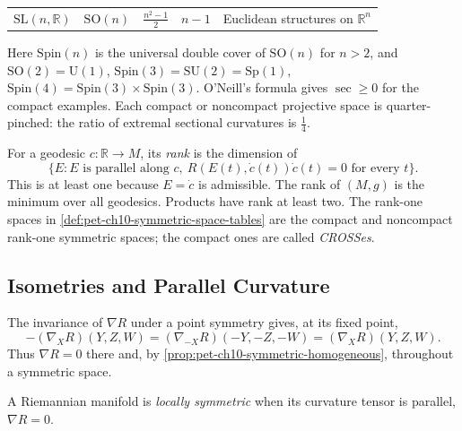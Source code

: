 \begin{definition}
\begin{center}
\begin{tabular}{l|l|c|c|l}
      $\mathrm{SL}(n,\mathbb R)$ & $\mathrm{SO}(n)$ & $\tfrac{n^2-1}2$ & $n-1$ & Euclidean structures on $\mathbb R^n$
    \end{tabular}
  \end{center}
  Here $\mathrm{Spin}(n)$ is the universal double cover of $\mathrm{SO}(n)$ for
  $n>2$, and
  $\mathrm{SO}(2)=\mathrm U(1)$, $\mathrm{Spin}(3)=\mathrm{SU}(2)=\mathrm{Sp}(1)$,
  $\mathrm{Spin}(4)=\mathrm{Spin}(3)\times\mathrm{Spin}(3)$. O'Neill's formula
  gives $\sec\ge0$ for the compact examples. Each compact or noncompact
  projective space is quarter-pinched: the ratio of extremal sectional
  curvatures is $\tfrac14$.
\end{definition}

\begin{definition}
  \label{def:pet-ch10-rank}

  For a geodesic $c:\mathbb R\to M$, its \emph{rank} is the dimension of
  \[
    \{E:E\text{ is parallel along }c,
      \ R(E(t),\dot c(t))\dot c(t)=0\text{ for every }t\}.
  \]
  This is at least one because $E=\dot c$ is admissible. The rank of $(M,g)$
  is the minimum over all geodesics. Products have rank at least two. The
  rank-one spaces in \cref{def:pet-ch10-symmetric-space-tables} are the
  compact and noncompact rank-one symmetric spaces; the compact ones are
  called \emph{CROSSes}.
\end{definition}

\subsection{Isometries and Parallel Curvature}

The invariance of $\nabla R$ under a point symmetry gives, at its fixed point,
\[
  -(\nabla_XR)(Y,Z,W)
  =(\nabla_{-X}R)(-Y,-Z,-W)=(\nabla_XR)(Y,Z,W).
\]
Thus $\nabla R=0$ there and, by
\cref{prop:pet-ch10-symmetric-homogeneous}, throughout a symmetric space.

\begin{definition}
  \label{def:pet-ch10-locally-symmetric-space}

  A Riemannian manifold is \emph{locally symmetric} when its curvature tensor
  is parallel, $\nabla R=0$.
\end{definition}

